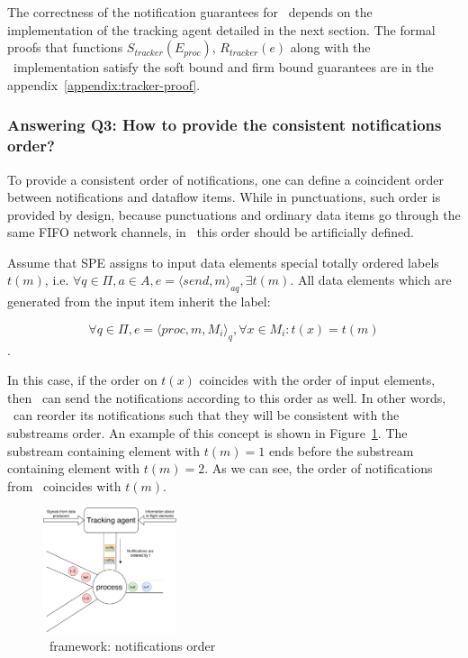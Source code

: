The correctness of the notification guarantees for \tracker\ depends on the implementation of the tracking agent detailed in the next section. The formal proofs that functions $S_{tracker}(E_{proc})$, $R_{tracker}(e)$ along with the \tracker\ implementation satisfy the soft bound and firm bound guarantees are in the appendix~\ref{appendix:tracker-proof}.

\subsubsection{Answering Q3: How to provide the consistent notifications order?}
To provide a consistent order of notifications, one can define a coincident order between notifications and dataflow items. While in punctuations, such order is provided by design, because punctuations and ordinary data items go through the same FIFO network channels, in \tracker\, this order should be artificially defined.

Assume that SPE assigns to input data elements special totally ordered labels $t(m)$, i.e. $\forall q\in \Pi,a\in A, e=\langle send,m\rangle_{aq}, \exists t(m)$. All data elements which are generated from the input item inherit the label: 

$$\forall q\in \Pi, e=\langle proc,m,M_i\rangle_q, \forall x \in M_i : t(x) = t(m)$$.

In this case, if the order on $t(x)$ coincides with the order of input elements, then \tracker\ can send the notifications according to this order as well. In other words, \tracker\ can reorder its notifications such that they will be consistent with the substreams order. An example of this concept is shown in Figure~\ref{tracker_ordering}. The substream containing element with $t(m)=1$ ends before the substream containing element with $t(m)=2$. As we can see, the order of notifications from \tracker\ coincides with $t(m)$.

\begin{figure}[htbp]
  \centering
  \includegraphics[width=0.35\textwidth]{pics/tracker-ordering.pdf}
  \caption{\tracker\ framework: notifications order}
  \label{tracker_ordering}
\end{figure}

